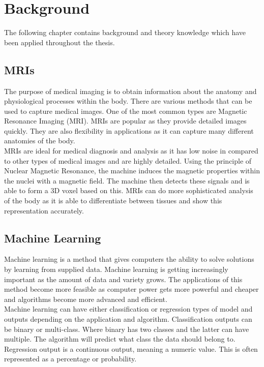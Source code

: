 \chapter{Background}
The following chapter contains background and theory knowledge which have been applied throughout the thesis. 
\section{MRIs}
The purpose of medical imaging is to obtain information about the anatomy and physiological processes within the body. There are various methods that can be used to capture medical images. One of the most common types are Magnetic Resonance Imaging (MRI). MRIs are popular as they provide detailed images quickly. They are also flexibility in applications as it can capture many different anatomies of the body. \cite{ref:mri_1}
\\[1\baselineskip] 
MRIs are ideal for medical diagnosis and analysis as it has low noise in compared to other types of medical images and are highly detailed. Using the principle of Nuclear Magnetic Resonance, the machine induces the magnetic properties within the nuclei with a magnetic field. The machine then detects these signals and is able to form a 3D voxel based on this. MRIs can do more sophisticated analysis of the body as it is able to differentiate between tissues and show this representation accurately. \cite{ref:mri_2}

\section{Machine Learning}
Machine learning is a method that gives computers the ability to solve solutions by learning from supplied data. Machine learning is getting increasingly important as the amount of data and variety grows. The applications of this method become more feasible as computer power gets more powerful and cheaper and algorithms become more advanced and efficient. 
\\[1\baselineskip]
Machine learning can have either classification or regression types of model and outputs depending on the application and algorithm. Classification outputs can be binary or multi-class. Where binary has two classes and the latter can have multiple. The algorithm will predict what class the data should belong to. Regression output is a continuous output, meaning a numeric value. This is often represented as a percentage or probability.  

